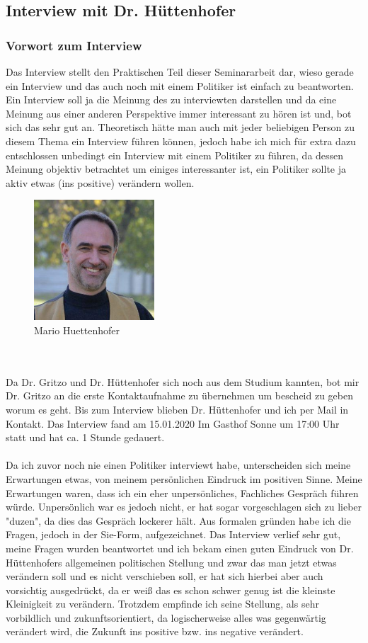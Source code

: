 \newpage
\subsection{Interview mit Dr. Hüttenhofer}

\subsubsection{Vorwort zum Interview}
Das Interview stellt den Praktischen Teil dieser Seminararbeit dar, wieso gerade ein Interview und das auch noch mit einem Politiker ist einfach zu beantworten. Ein Interview soll ja die Meinung des zu interviewten darstellen und da eine Meinung aus einer anderen Perspektive immer interessant zu hören ist und, bot sich das sehr gut an. Theoretisch hätte man auch mit jeder beliebigen Person zu diesem Thema ein Interview führen können, jedoch habe ich mich für extra dazu entschlossen unbedingt ein Interview mit einem Politiker zu führen, da dessen Meinung objektiv betrachtet um einiges interessanter ist, ein Politiker sollte ja aktiv etwas (ins positive) verändern wollen.
\begin{figure}
    \includegraphics[width=4.5cm]{Mario.jpg}
    \caption{Mario Huettenhofer \cite{Gruene}}
\end{figure}\\
\\
Da Dr. Gritzo und Dr. Hüttenhofer sich noch aus dem Studium kannten, bot mir Dr. Gritzo an die erste Kontaktaufnahme zu übernehmen um bescheid zu geben worum es geht. Bis zum Interview blieben Dr. Hüttenhofer und ich per Mail in Kontakt. Das Interview fand am 15.01.2020 Im Gasthof \glqq Sonne\grqq{} um 17:00 Uhr statt und hat ca. 1 Stunde gedauert.\\
\\
Da ich zuvor noch nie einen Politiker interviewt habe, unterscheiden sich meine Erwartungen etwas, von meinem persönlichen Eindruck im positiven Sinne. Meine Erwartungen waren, dass ich ein eher unpersönliches, Fachliches Gespräch führen würde. Unpersönlich war es jedoch nicht, er hat sogar vorgeschlagen sich zu lieber "duzen", da dies das Gespräch lockerer hält. Aus formalen gründen habe ich die Fragen, jedoch in der \glqq Sie\grqq{}-Form, aufgezeichnet. Das Interview verlief sehr gut, meine Fragen wurden beantwortet und ich bekam einen guten Eindruck von Dr. Hüttenhofers allgemeinen politischen Stellung und zwar das man jetzt etwas verändern soll und es nicht verschieben soll, er hat sich hierbei aber auch vorsichtig ausgedrückt, da er weiß das es schon schwer genug ist die kleinste Kleinigkeit zu verändern. Trotzdem empfinde ich seine Stellung, als sehr vorbildlich und zukunftsorientiert, da logischerweise alles was gegenwärtig verändert wird, die Zukunft ins positive bzw. ins negative verändert.\\
